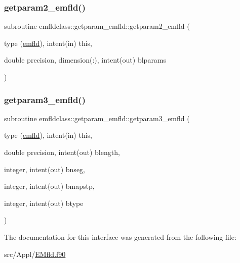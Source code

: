 \mbox{\label{interfaceemfldclass_1_1getparam__emfld_aae88564a44a9c847267fc62e40ae1b8c}} 
\subsubsection{\texorpdfstring{getparam2\_emfld()}{getparam2\_emfld()}}
{\footnotesize\ttfamily subroutine emfldclass\+::getparam\+\_\+emfld\+::getparam2\+\_\+emfld (\begin{DoxyParamCaption}\item[{type (\mbox{\hyperlink{namespaceemfldclass_structemfldclass_1_1emfld}{emfld}}), intent(in)}]{this,  }\item[{double precision, dimension(\+:), intent(out)}]{blparams }\end{DoxyParamCaption})}

\mbox{\label{interfaceemfldclass_1_1getparam__emfld_a938f7c1ed0d9e62772ab58826827fd7d}} 
\subsubsection{\texorpdfstring{getparam3\_emfld()}{getparam3\_emfld()}}
{\footnotesize\ttfamily subroutine emfldclass\+::getparam\+\_\+emfld\+::getparam3\+\_\+emfld (\begin{DoxyParamCaption}\item[{type (\mbox{\hyperlink{namespaceemfldclass_structemfldclass_1_1emfld}{emfld}}), intent(in)}]{this,  }\item[{double precision, intent(out)}]{blength,  }\item[{integer, intent(out)}]{bnseg,  }\item[{integer, intent(out)}]{bmapstp,  }\item[{integer, intent(out)}]{btype }\end{DoxyParamCaption})}



The documentation for this interface was generated from the following file\+:\begin{DoxyCompactItemize}
\item 
src/\+Appl/\mbox{\hyperlink{_e_mfld_8f90}{E\+Mfld.\+f90}}\end{DoxyCompactItemize}
